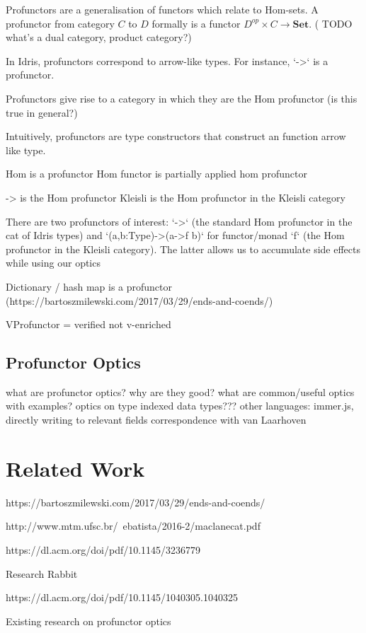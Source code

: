 \documentclass[]{report}
\begin{document}
Profunctors are a generalisation of functors which relate to Hom-sets. A profunctor from category $C$ to $D$ formally is a functor $D^{op}\times C\to\mathbf{Set}$. ( TODO what's a dual category, product category?)

In Idris, profunctors correspond to arrow-like types. For instance, `->` is a profunctor. 

Profunctors give rise to a category in which they are the Hom profunctor (is this true in general?)

Intuitively, profunctors are type constructors that construct an function arrow like type.

Hom is a profunctor
Hom functor is partially applied hom profunctor

-> is the Hom profunctor
Kleisli is the Hom profunctor in the Kleisli category

There are two profunctors of interest: `->` (the standard Hom profunctor in the cat of Idris types) and `(a,b:Type)->(a->f b)` for functor/monad `f` (the Hom profunctor in the Kleisli category). The latter allows us to accumulate side effects while using our optics

Dictionary / hash map is a profunctor (https://bartoszmilewski.com/2017/03/29/ends-and-coends/)

VProfunctor = verified not v-enriched

\subsection{Profunctor Optics}

what are profunctor optics?
why are they good?
what are common/useful optics with examples?
optics on type indexed data types???
other languages: immer.js, directly writing to relevant fields
correspondence with van Laarhoven \cite{boisseau2018yoneda}

\section{Related Work}


https://bartoszmilewski.com/2017/03/29/ends-and-coends/

http://www.mtm.ufsc.br/~ebatista/2016-2/maclanecat.pdf

https://dl.acm.org/doi/pdf/10.1145/3236779

Research Rabbit

https://dl.acm.org/doi/pdf/10.1145/1040305.1040325

Existing research on profunctor optics
\end{document}
